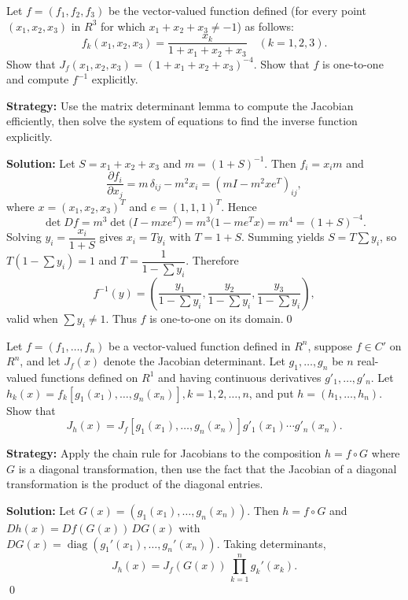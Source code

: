 \begin{problembox}
Let \( f = (f_1, f_2, f_3) \) be the vector-valued function defined (for every point \( (x_1, x_2, x_3) \) in \( R^3 \) for which \( x_1 + x_2 + x_3 \neq -1 \)) as follows:
\[f_k(x_1, x_2, x_3) = \frac{x_k}{1 + x_1 + x_2 + x_3} \quad (k = 1, 2, 3).\]
Show that \( J_f(x_1, x_2, x_3) = (1 + x_1 + x_2 + x_3)^{-4} \). Show that \( f \) is one-to-one and compute \( f^{-1} \) explicitly.
\end{problembox}

\noindent\textbf{Strategy:} Use the matrix determinant lemma to compute the Jacobian efficiently, then solve the system of equations to find the inverse function explicitly.

\bigskip\noindent\textbf{Solution:}
Let $S=x_1+x_2+x_3$ and $m=(1+S)^{-1}$. Then $f_i=x_im$ and
\[\frac{\partial f_i}{\partial x_j}=m\,\delta_{ij}-m^2 x_i=(mI-m^2xe^{\!T})_{ij},\]
where $x=(x_1,x_2,x_3)^{\!T}$ and $e=(1,1,1)^{\!T}$. Hence
\[\det Df=m^3\det\big(I-mxe^{\!T}\big)=m^3\big(1-me^{\!T}x\big)=m^4=(1+S)^{-4}.
\]
Solving $y_i=\dfrac{x_i}{1+S}$ gives $x_i=Ty_i$ with $T=1+S$. Summing yields $S=T\sum y_i$, so $T(1-\sum y_i)=1$ and $T=\dfrac{1}{1-\sum y_i}$. Therefore
\[f^{-1}(y)=\left(\frac{y_1}{1-\sum y_i},\frac{y_2}{1-\sum y_i},\frac{y_3}{1-\sum y_i}\right),\]
valid when $\sum y_i\neq 1$. Thus $f$ is one-to-one on its domain.\qed


\begin{problembox}
Let \( f = (f_1, \ldots, f_n) \) be a vector-valued function defined in \( R^n \), suppose \( f \in C' \) on \( R^n \), and let \( J_f(x) \) denote the Jacobian determinant. Let \( g_1, \ldots, g_n \) be \( n \) real-valued functions defined on \( R^1 \) and having continuous derivatives \( g'_1, \ldots, g'_n \). Let \( h_k(x) = f_k[g_1(x_1), \ldots, g_n(x_n)], k = 1, 2, \ldots, n \), and put \( h = (h_1, \ldots, h_n) \). Show that
\[J_h(x) = J_f[g_1(x_1), \ldots, g_n(x_n)]g'_1(x_1) \cdots g'_n(x_n).\]
\end{problembox}

\noindent\textbf{Strategy:} Apply the chain rule for Jacobians to the composition $h=f\circ G$ where $G$ is a diagonal transformation, then use the fact that the Jacobian of a diagonal transformation is the product of the diagonal entries.

\bigskip\noindent\textbf{Solution:}
Let $G(x)=(g_1(x_1),\dots,g_n(x_n))$. Then $h=f\circ G$ and $Dh(x)=Df(G(x))\,DG(x)$ with $DG(x)=\operatorname{diag}(g_1'(x_1),\dots,g_n'(x_n))$. Taking determinants,
\[J_h(x)=J_f(G(x))\,\prod_{k=1}^n g_k'(x_k).
\]\qed


